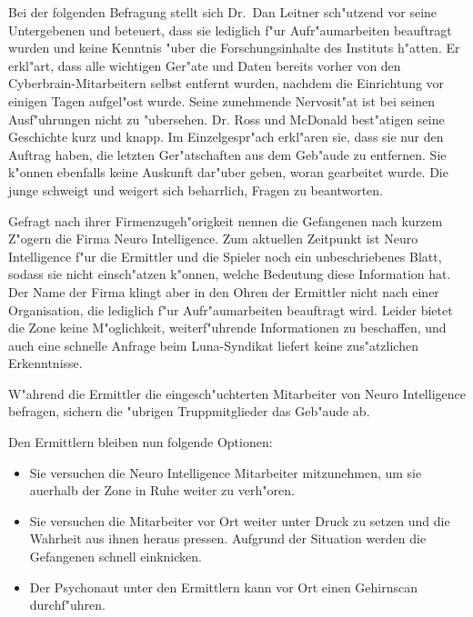 Bei der folgenden Befragung stellt sich Dr.~Dan Leitner sch"utzend vor seine Untergebenen und beteuert, dass sie lediglich f"ur Aufr"aumarbeiten beauftragt wurden und keine Kenntnis "uber die Forschungsinhalte des Instituts h"atten. Er erkl"art, dass alle wichtigen Ger"ate und Daten bereits vorher von den Cyberbrain-Mitarbeitern selbst entfernt wurden, nachdem die Einrichtung vor einigen Tagen aufgel"ost wurde. Seine zunehmende Nervosit"at ist bei seinen Ausf"uhrungen nicht zu "ubersehen. Dr. Ross und McDonald best"atigen seine Geschichte kurz und knapp. Im Einzelgespr"ach erkl"aren sie, dass sie nur den Auftrag haben, die letzten Ger"atschaften aus dem Geb"aude zu entfernen. Sie k"onnen ebenfalls keine Auskunft dar"uber geben, woran gearbeitet wurde. Die junge \ml{} schweigt und weigert sich beharrlich, Fragen zu beantworten.

Gefragt nach ihrer Firmenzugeh"origkeit nennen die Gefangenen nach kurzem Z"ogern die Firma Neuro Intelligence. Zum aktuellen Zeitpunkt ist Neuro Intelligence f"ur die Ermittler und die Spieler noch ein unbeschriebenes Blatt, sodass sie nicht einsch"atzen k"onnen, welche Bedeutung diese Information hat. Der Name der Firma klingt aber in den Ohren der Ermittler nicht nach einer Organisation, die lediglich f"ur Aufr"aumarbeiten beauftragt wird. Leider bietet die Zone keine M"oglichkeit, weiterf"uhrende Informationen zu beschaffen, und auch eine schnelle Anfrage beim Luna-Syndikat liefert keine zus"atzlichen Erkenntnisse.

W"ahrend die Ermittler die eingesch"uchterten Mitarbeiter von Neuro Intelligence befragen, sichern die "ubrigen Truppmitglieder das Geb"aude ab. 

Den Ermittlern bleiben nun folgende Optionen:

\begin{itemize}
	\item Sie versuchen die Neuro Intelligence Mitarbeiter mitzunehmen, um sie au\3erhalb der Zone in Ruhe weiter zu verh"oren.
	\item Sie versuchen die Mitarbeiter vor Ort weiter unter Druck zu setzen und die Wahrheit aus ihnen heraus pressen. Aufgrund 
		der Situation werden die Gefangenen schnell einknicken.
	\item Der Psychonaut unter den Ermittlern kann vor Ort einen Gehirnscan durchf"uhren.
\end{itemize}

